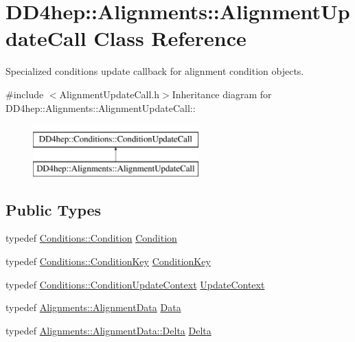 \hypertarget{class_d_d4hep_1_1_alignments_1_1_alignment_update_call}{
\section{DD4hep::Alignments::AlignmentUpdateCall Class Reference}
\label{class_d_d4hep_1_1_alignments_1_1_alignment_update_call}
}


Specialized conditions update callback for alignment condition objects.  


{\ttfamily \#include $<$AlignmentUpdateCall.h$>$}Inheritance diagram for DD4hep::Alignments::AlignmentUpdateCall::\begin{figure}[H]
\begin{center}
\leavevmode
\includegraphics[height=2cm]{class_d_d4hep_1_1_alignments_1_1_alignment_update_call}
\end{center}
\end{figure}
\subsection*{Public Types}
\begin{DoxyCompactItemize}
\item 
typedef \hyperlink{class_d_d4hep_1_1_conditions_1_1_condition}{Conditions::Condition} \hyperlink{class_d_d4hep_1_1_alignments_1_1_alignment_update_call_ac41c367dd7b7027a76d7b691223927fd}{Condition}
\item 
typedef \hyperlink{class_d_d4hep_1_1_conditions_1_1_condition_key}{Conditions::ConditionKey} \hyperlink{class_d_d4hep_1_1_alignments_1_1_alignment_update_call_a3c759edb169218bd8bc3b1c15d8af2e0}{ConditionKey}
\item 
typedef \hyperlink{class_d_d4hep_1_1_conditions_1_1_condition_update_context}{Conditions::ConditionUpdateContext} \hyperlink{class_d_d4hep_1_1_alignments_1_1_alignment_update_call_a648c995a6ab187911c79a687c8df0fa9}{UpdateContext}
\item 
typedef \hyperlink{class_d_d4hep_1_1_alignments_1_1_alignment_data}{Alignments::AlignmentData} \hyperlink{class_d_d4hep_1_1_alignments_1_1_alignment_update_call_af07241d13f0759c3a94c4589463cfb1b}{Data}
\item 
typedef \hyperlink{class_d_d4hep_1_1_alignments_1_1_delta}{Alignments::AlignmentData::Delta} \hyperlink{class_d_d4hep_1_1_alignments_1_1_alignment_update_call_a06a6522dece2daba45cdc69c079e144c}{Delta}
\end{DoxyCompactItemize}
